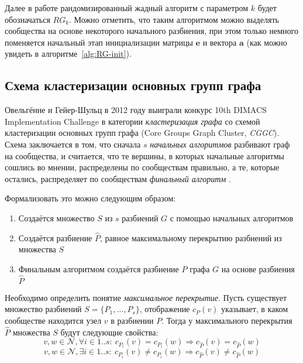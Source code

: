 \vspace{0.1cm}
Далее в работе рандомизированный жадный алгоритм с параметром $k$ будет обозначаться $RG_k$.
Можно отметить, что таким алгоритмом можно выделять сообщества на основе некоторого начального разбиения, при этом только немного поменяется начальный этап инициализации матрицы $\mathbf{e}$ и вектора $\mathbf{a}$ (как можно увидеть в алгоритме~\ref{alg:RG-init}).


\subsection{Схема кластеризации основных групп графа}
\label{subsec:ens}

Овельгённе и Гейер-Шульц в 2012 году выиграли конкурс 10th DIMACS Implementation Challenge в категории \emph{кластеризация графа} со схемой кластеризации основных групп графа (Core Groups Graph Cluster, \emph{CGGC}). Схема заключается в том, что сначала $s$ \emph{начальных алгоритмов} разбивают граф на сообщества, и считается, что те вершины, в которых начальные алгоритмы сошлись во мнении, распределены по сообществам правильно, а те, которые остались, распределяет по сообществам \emph{финальный алгоритм} \cite{Ovelgoenne&Geyer-Schulz:2012b}.

Формализовать это можно следующим образом:
\begin{enumerate}
	\item Создаётся множество $S$ из $s$ разбиений $G$ с помощью начальных алгоритмов
	\item Создаётся разбиение $\hat{P}$, равное максимальному перекрытию разбиений из множества $S$
	\item Финальным алгоритмом создаётся разбиение $P$ графа $G$ на основе разбиения $\hat{P}$
\end{enumerate}

Необходимо определить понятие \emph{максимальное перекрытие}. Пусть существует множество разбиений $S = \{P_1, \dots, P_s\}$, отображение $c_P(v)$ указывает, в каком сообществе находится узел $v$ в разбиении $P$.
Тогда у максимального перекрытия $\hat{P}$ множества $S$ будут следующие свойства:
$$v, w \in \mathscr{N}, \forall i \in 1..s :\ c_{P_i}(v) = c_{P_i}(w) \Rightarrow c_{\hat{P}}(v) = c_{\hat{P}}(w)$$
$$v, w \in \mathscr{N}, \exists i \in 1..s :\ c_{P_i}(v) \ne c_{P_i}(w) \Rightarrow c_{\hat{P}}(v) \ne c_{\hat{P}}(w)$$

